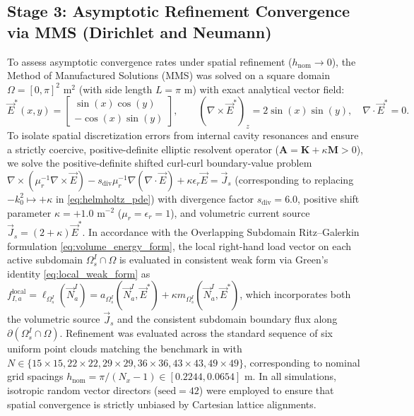 \documentclass[preprint,12pt]{elsarticle}
\begin{document}
\subsection{Stage 3: Asymptotic Refinement Convergence via MMS (Dirichlet and Neumann)}
\label{subsec:stage3_mms}

To assess asymptotic convergence rates under spatial refinement ($h_{\mathrm{nom}} \to 0$), the Method of Manufactured Solutions (MMS) was solved on a square domain $\Omega = [0, \pi]^2\text{ m}^2$ (with side length $L = \pi\text{ m}$) with exact analytical vector field:
\begin{equation}
    \vec{E}^*(x, y) = \begin{bmatrix} \sin(x) \cos(y) \\ -\cos(x) \sin(y) \end{bmatrix}, \qquad (\nabla \times \vec{E}^*)_z = 2\sin(x)\sin(y), \quad \nabla \cdot \vec{E}^* = 0.
\end{equation}
To isolate spatial discretization errors from internal cavity resonances and ensure a strictly coercive, positive-definite elliptic resolvent operator ($\mathbf{A} = \mathbf{K} + \kappa \mathbf{M} > 0$), we solve the positive-definite shifted curl-curl boundary-value problem $\nabla \times (\mu_r^{-1} \nabla \times \vec{E}) - s_{\mathrm{div}} \mu_r^{-1} \nabla(\nabla \cdot \vec{E}) + \kappa \epsilon_r \vec{E} = \vec{J}_s$ (corresponding to replacing $-k_0^2 \mapsto +\kappa$ in \eqref{eq:helmholtz_pde}) with divergence factor $s_{\mathrm{div}} = 6.0$, positive shift parameter $\kappa = +1.0\text{ m}^{-2}$ ($\mu_r = \epsilon_r = 1$), and volumetric current source $\vec{J}_s = (2 + \kappa) \vec{E}^*$. In accordance with the Overlapping Subdomain Ritz--Galerkin formulation \eqref{eq:volume_energy_form}, the local right-hand load vector on each active subdomain $\Omega_s^I \cap \Omega$ is evaluated in consistent weak form via Green's identity \eqref{eq:local_weak_form} as $f_{I, a}^{\mathrm{local}} = \ell_{\Omega_s^I}(\vec{N}_a^I) = a_{\Omega_s^I}(\vec{N}_a^I, \vec{E}^*) + \kappa m_{\Omega_s^I}(\vec{N}_a^I, \vec{E}^*)$, which incorporates both the volumetric source $\vec{J}_s$ and the consistent subdomain boundary flux along $\partial(\Omega_s^I \cap \Omega)$. Refinement was evaluated across the standard sequence of six uniform point clouds matching the benchmark in \cite{stable_vnmm2d_2026} with $N \in \{15 \times 15, 22 \times 22, 29 \times 29, 36 \times 36, 43 \times 43, 49 \times 49\}$, corresponding to nominal grid spacings $h_{\mathrm{nom}} = \pi/(N_x-1) \in [0.2244, 0.0654]\text{ m}$. In all simulations, isotropic random vector directors ($\text{seed}=42$) were employed to ensure that spatial convergence is strictly unbiased by Cartesian lattice alignments.
\end{document}
